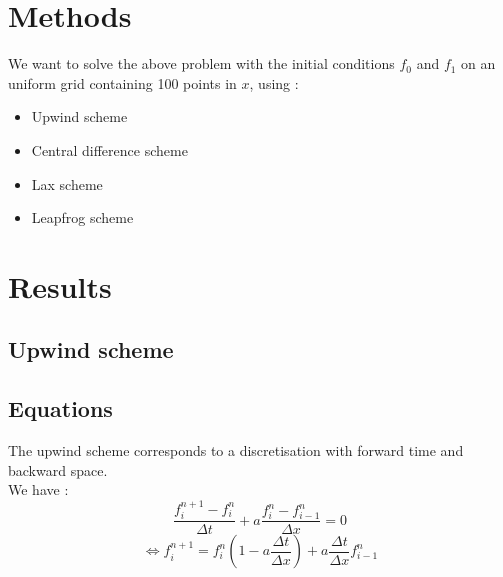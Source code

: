 \documentclass{report}
\begin{document}
            \chapter{Methods}
                We want to solve the above problem with the initial conditions
    $f_{0}$ and $f_{1}$ on an uniform grid containing 100 points in $x$, using :
                \begin{itemize}
                    \item Upwind scheme
                    \item Central difference scheme
                    \item Lax scheme
                    \item Leapfrog scheme
                \end{itemize}
            \chapter{Results}
                \section*{Upwind scheme}
                    \section{Equations}
                        The upwind scheme corresponds to a discretisation with forward time and backward space.\\
                        We have :
                        \vspace{2mm}
                        \[
                            \frac{f_{i}^{n+1} - f_{i}^{n}}{\Delta t}
                            + a \frac{f_{i}^{n} - f_{i-1}^{n}}{\Delta x}
                            = 0
                        \]
                        \vspace{2mm}
                        \begin{equation}
                            \Leftrightarrow 
                            f_{i}^{n+1} = f_{i}^{n} (1 - a \frac{\Delta t}{\Delta x}) 
                            + a \frac{\Delta t}{\Delta x} f_{i-1}^{n}
                        \end{equation}
\end{document}
